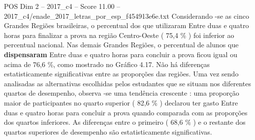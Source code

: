 \begin{textsample}{POS Dim 2 – 2017\_c4 – Score 11.00 – 2017\_c4/enade\_2017\_letras\_por\_esp\_f454913e6e.txt}
Considerando -se as cinco Grandes Regiões brasileiras, o percentual dos que utilizaram Entre duas e quatro horas para finalizar a prova na região Centro-Oeste ( 75,4 \% ) foi inferior ao percentual nacional.
Nas demais Grandes Regiões, o percentual de alunos que \textbf{dispensaram} Entre duas e quatro horas para concluir a prova ficou igual ou acima de 76,6 \%, como mostrado no Gráfico 4.17.
Não há diferenças estatisticamente significativas entre as proporções das regiões.
Uma vez sendo analisadas as alternativas escolhidas pelos estudantes que se situam nos diferentes quartos de desempenho, observa -se uma tendência crescente : uma proporção maior de participantes no quarto superior ( 82,6 \% ) declarou ter gasto Entre duas e quatro horas para concluir a prova quando comparada com as proporções dos quartos inferiores.
As diferenças entre o primeiro ( 68,6 \% ) e o restante dos quartos superiores de desempenho são estatisticamente significativas.

\end{textsample}
